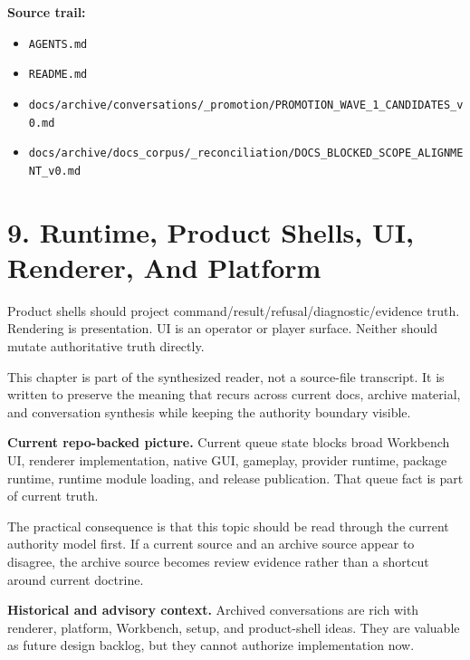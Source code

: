 \documentclass[10.5pt,a4paper,openany]{book}
\begin{document}
\textbf{Source trail:}


\begin{itemize}
\item \texttt{AGENTS.\allowbreak{}md}
\item \texttt{README.\allowbreak{}md}
\item \texttt{docs/\allowbreak{}archive/\allowbreak{}conversations/\allowbreak{}\_\allowbreak{}promotion/\allowbreak{}PROMOTION\_\allowbreak{}WAVE\_\allowbreak{}1\_\allowbreak{}CANDIDATES\_\allowbreak{}v0.\allowbreak{}md}
\item \texttt{docs/\allowbreak{}archive/\allowbreak{}docs\_\allowbreak{}corpus/\allowbreak{}\_\allowbreak{}reconciliation/\allowbreak{}DOCS\_\allowbreak{}BLOCKED\_\allowbreak{}SCOPE\_\allowbreak{}ALIGNMENT\_\allowbreak{}v0.\allowbreak{}md}
\end{itemize}


\section{9. Runtime, Product Shells, UI, Renderer, And Platform}

Product shells should project command/\allowbreak{}result/\allowbreak{}refusal/\allowbreak{}diagnostic/\allowbreak{}evidence truth.\allowbreak{} Rendering is presentation.\allowbreak{} UI is an operator or player surface.\allowbreak{} Neither should mutate authoritative truth directly.\allowbreak{}


This chapter is part of the synthesized reader, not a source-\allowbreak{}file transcript.\allowbreak{} It is written to preserve the meaning that recurs across current docs, archive material, and conversation synthesis while keeping the authority boundary visible.\allowbreak{}


\textbf{Current repo-backed picture.} Current queue state blocks broad Workbench UI, renderer implementation, native GUI, gameplay, provider runtime, package runtime, runtime module loading, and release publication.\allowbreak{} That queue fact is part of current truth.\allowbreak{}


The practical consequence is that this topic should be read through the current authority model first.\allowbreak{} If a current source and an archive source appear to disagree, the archive source becomes review evidence rather than a shortcut around current doctrine.\allowbreak{}


\textbf{Historical and advisory context.} Archived conversations are rich with renderer, platform, Workbench, setup, and product-\allowbreak{}shell ideas.\allowbreak{} They are valuable as future design backlog, but they cannot authorize implementation now.\allowbreak{}
\end{document}
